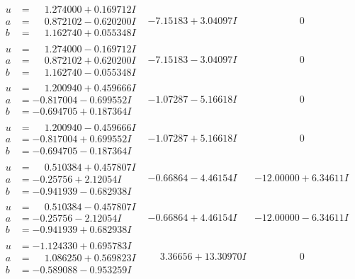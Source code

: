 \documentclass[1p]{elsarticle_modified}
\theoremstyle{definition}
\begin{document}
$$\begin{array}{c|c|c}
\begin{aligned}
u &= \phantom{-}1.274000 + 0.169712 I \\
a &= \phantom{-}0.872102 - 0.620200 I \\
b &= \phantom{-}1.162740 + 0.055348 I\end{aligned}
 & -7.15183 + 3.04097 I & \phantom{-0.000000 } 0 \\ \hline\begin{aligned}
u &= \phantom{-}1.274000 - 0.169712 I \\
a &= \phantom{-}0.872102 + 0.620200 I \\
b &= \phantom{-}1.162740 - 0.055348 I\end{aligned}
 & -7.15183 - 3.04097 I & \phantom{-0.000000 } 0 \\ \hline\begin{aligned}
u &= \phantom{-}1.200940 + 0.459666 I \\
a &= -0.817004 - 0.699552 I \\
b &= -0.694705 + 0.187364 I\end{aligned}
 & -1.07287 - 5.16618 I & \phantom{-0.000000 } 0 \\ \hline\begin{aligned}
u &= \phantom{-}1.200940 - 0.459666 I \\
a &= -0.817004 + 0.699552 I \\
b &= -0.694705 - 0.187364 I\end{aligned}
 & -1.07287 + 5.16618 I & \phantom{-0.000000 } 0 \\ \hline\begin{aligned}
u &= \phantom{-}0.510384 + 0.457807 I \\
a &= -0.25756 + 2.12054 I \\
b &= -0.941939 - 0.682938 I\end{aligned}
 & -0.66864 - 4.46154 I & -12.00000 + 6.34611 I \\ \hline\begin{aligned}
u &= \phantom{-}0.510384 - 0.457807 I \\
a &= -0.25756 - 2.12054 I \\
b &= -0.941939 + 0.682938 I\end{aligned}
 & -0.66864 + 4.46154 I & -12.00000 - 6.34611 I \\ \hline\begin{aligned}
u &= -1.124330 + 0.695783 I \\
a &= \phantom{-}1.086250 + 0.569823 I \\
b &= -0.589088 - 0.953259 I\end{aligned}
 & \phantom{-}3.36656 + 13.30970 I & \phantom{-0.000000 } 0\\

\end{array}$$
\end{document}
